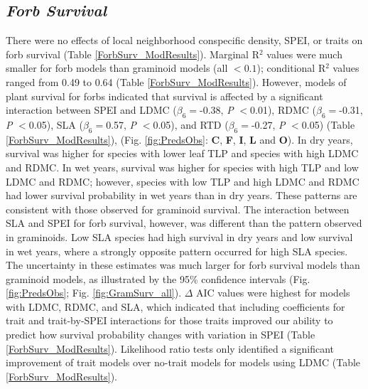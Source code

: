 \documentclass[12pt, letterpaper]{article}
\begin{document}
\subsection{\textit{Forb Survival}} 
There were no effects of local neighborhood conspecific density, SPEI, or traits on forb survival (Table \ref{ForbSurv_ModResults}). Marginal R$^2$ values were much smaller for forb models than graminoid models (all $<0.1$); conditional R$^2$ values ranged from 0.49 to 0.64 (Table \ref{ForbSurv_ModResults}). However, models of plant survival for forbs indicated that survival is affected by a significant interaction between SPEI and LDMC ($\beta_6=$-0.38, \textit{P} $<$0.01), RDMC ($\beta _6=$-0.31, \textit{P} $<$0.05), SLA ($\beta _6=$0.57, \textit{P} $<$0.05), and RTD ($\beta _6=$-0.27, \textit{P} $<$0.05) (Table \ref{ForbSurv_ModResults}), (Fig. \ref{fig:PredsObs}: \textbf{C}, \textbf{F}, \textbf{I}, \textbf{L} and \textbf{O}). In dry years, survival was higher for species with lower leaf TLP and species with high LDMC and RDMC. In wet years, survival was higher for species with high TLP and low LDMC and RDMC; however, species with low TLP and high LDMC and RDMC had lower survival probability in wet years than in dry years. These patterns are consistent with those observed for graminoid survival. The interaction between SLA and SPEI for forb survival, however, was different than the pattern observed in graminoids. Low SLA species had high survival in dry years and low survival in wet years, where a strongly opposite pattern occurred for high SLA species. The uncertainty in these estimates was much larger for forb survival models than graminoid models, as illustrated by the 95\% confidence intervals (Fig. \ref{fig:PredsObs}; Fig. \ref{fig:GramSurv_all}). $\Delta$ AIC values were highest for models with LDMC, RDMC, and SLA, which indicated that including coefficients for trait and trait-by-SPEI interactions for those traits improved our ability to predict how survival probability changes with variation in SPEI (Table \ref{ForbSurv_ModResults}). Likelihood ratio tests only identified a significant improvement of trait models over no-trait models for models using LDMC (Table \ref{ForbSurv_ModResults}). 
\end{document}
